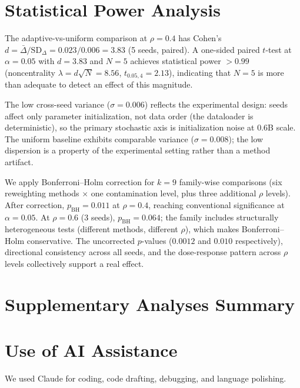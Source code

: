 \section{Statistical Power Analysis}
\label{app:power}

The adaptive-vs-uniform comparison at $\rho{=}0.4$ has Cohen's $d = \bar{\Delta}/\mathrm{SD}_{\Delta} = 0.023/0.006 = 3.83$ (5 seeds, paired).
A one-sided paired $t$-test at $\alpha{=}0.05$ with $d{=}3.83$ and $N{=}5$ achieves statistical power ${>}0.99$ (noncentrality $\lambda = d\sqrt{N} = 8.56$, $t_{0.05,4} = 2.13$), indicating that $N{=}5$ is more than adequate to detect an effect of this magnitude.

The low cross-seed variance ($\sigma{=}0.006$) reflects the experimental design: seeds affect only parameter initialization, not data order (the dataloader is deterministic), so the primary stochastic axis is initialization noise at 0.6B scale.
The uniform baseline exhibits comparable variance ($\sigma{=}0.008$); the low dispersion is a property of the experimental setting rather than a method artifact.

We apply Bonferroni--Holm correction for $k{=}9$ family-wise comparisons (six reweighting methods $\times$ one contamination level, plus three additional $\rho$ levels).
After correction, $p_{\mathrm{BH}}{=}0.011$ at $\rho{=}0.4$, reaching conventional significance at $\alpha{=}0.05$.
At $\rho{=}0.6$ (3 seeds), $p_{\mathrm{BH}}{=}0.064$; the family includes structurally heterogeneous tests (different methods, different $\rho$), which makes Bonferroni--Holm conservative.
The uncorrected $p$-values ($0.0012$ and $0.010$ respectively), directional consistency across all seeds, and the dose-response pattern across $\rho$ levels collectively support a real effect.

\section{Supplementary Analyses Summary}
\label{app:summary}

\begin{table}[h]
\centering
\small
\setlength{\tabcolsep}{3pt}
\caption{Summary of supplementary analyses.}
\label{tab:appendix_summary}
\end{table}

\section{Use of AI Assistance}

We used Claude for coding, code drafting, debugging, and language polishing.

